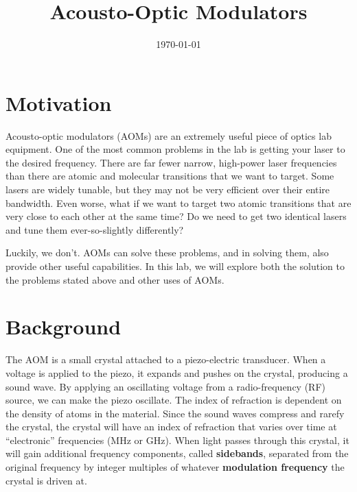 \documentclass[]{manual}
\title{Acousto-Optic Modulators}
\date{\today}
\begin{document}
    \maketitle
    \thispagestyle{firstpage}


    \section*{Motivation}

    Acousto-optic modulators (AOMs) are an extremely useful piece of optics lab equipment.
    One of the most common problems in the lab is getting your laser to the desired frequency.
    There are far fewer narrow, high-power laser frequencies than there are atomic and molecular transitions that we want to target.
    Some lasers are widely tunable, but they may not be very efficient over their entire bandwidth.
    Even worse, what if we want to target two atomic transitions that are very close to each other at the same time?
    Do we need to get two identical lasers and tune them ever-so-slightly differently?

    Luckily, we don't.
    AOMs can solve these problems, and in solving them, also provide other useful capabilities.
    In this lab, we will explore both the solution to the problems stated above and other uses of AOMs.

    \section*{Background}

    The AOM is a small crystal attached to a piezo-electric transducer.
    When a voltage is applied to the piezo, it expands and pushes on the crystal, producing a sound wave.
    By applying an oscillating voltage from a radio-frequency (RF) source, we can make the piezo oscillate.
    The index of refraction is dependent on the density of atoms in the material.  Since the sound waves compress and rarefy the crystal, the crystal will have an index of refraction that varies over time at ``electronic'' frequencies (\si{\mega\hertz} or \si{\giga\hertz}).
    When light passes through this crystal, it will gain additional frequency components, called \textbf{sidebands}, separated from the original frequency by integer multiples of whatever \textbf{modulation frequency} the crystal is driven at.
\end{document}
